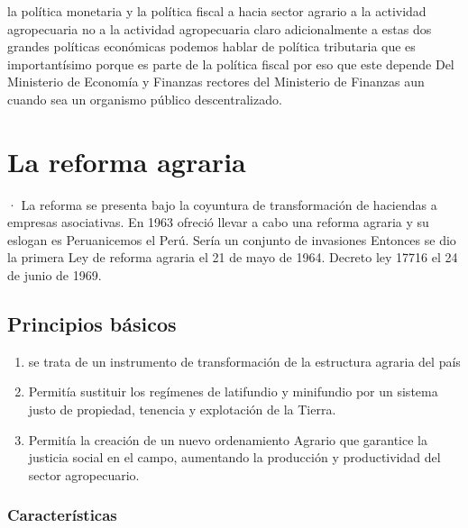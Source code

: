 \documentclass[
  letterpaper,
  DIV=11,
  numbers=noendperiod]{scrartcl}
\begin{document}
la política monetaria y la política fiscal a hacia sector agrario a la
actividad agropecuaria no a la actividad agropecuaria claro
adicionalmente a estas dos grandes políticas económicas podemos hablar
de política tributaria que es importantísimo porque es parte de la
política fiscal por eso que este depende Del Ministerio de Economía y
Finanzas rectores del Ministerio de Finanzas aun cuando sea un organismo
público descentralizado.

\hypertarget{la-reforma-agraria}{%
\section{La reforma agraria}\label{la-reforma-agraria}}

· La reforma se presenta bajo la coyuntura de transformación de
haciendas a empresas asociativas. En 1963 ofreció llevar a cabo una
reforma agraria y su eslogan es Peruanicemos el Perú. Sería un conjunto
de invasiones Entonces se dio la primera Ley de reforma agraria el 21 de
mayo de 1964. Decreto ley 17716 el 24 de junio de 1969.

\hypertarget{principios-buxe1sicos}{%
\subsection{Principios básicos}\label{principios-buxe1sicos}}

\begin{enumerate}
\def\labelenumi{\arabic{enumi}.}
\item
  se trata de un instrumento de transformación de la estructura agraria
  del país
\item
  Permitía sustituir los regímenes de latifundio y minifundio por un
  sistema justo de propiedad, tenencia y explotación de la Tierra.
\item
  Permitía la creación de un nuevo ordenamiento Agrario que garantice la
  justicia social en el campo, aumentando la producción y productividad
  del sector agropecuario.
\end{enumerate}

\hypertarget{caracteruxedsticas}{%
\subsubsection{Características}\label{caracteruxedsticas}}
\end{document}
